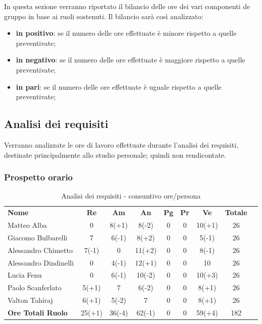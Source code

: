 
In questa sezione verranno riportato il bilancio delle ore dei vari componenti de gruppo in base ai ruoli sostenuti. Il bilancio sarà così analizzato:
\begin{itemize}
	\item {\bfseries in positivo}: se il numero delle ore effettuate è minore rispetto a quelle preventivate;
	\item {\bfseries in negativo}: se il numero delle ore effettuate è maggiore rispetto a quelle preventivate;
	\item {\bfseries in pari}: se il numero delle ore effettuate è uguale rispetto a quelle preventivate; \\
\end{itemize}
\newpage
\subsection {Analisi dei requisiti}
Verranno analizzate le ore di lavoro effettuate durante l'analisi dei requisiti, destinate principalmente allo studio personale; quindi non rendicontate.
\subsubsection{Prospetto orario}
	\begin{table} [h!]
	\begin{center}
		\begin{tabular} { m{6 cm} c c c c c c c c }
			\rowcolor{lightgray}
			\textbf{Nome} & \textbf{Re} & \textbf{Am} & \textbf{An} & \textbf{Pg} &\textbf{Pr} & \textbf{Ve} & \textbf{Totale} \\ 
			Matteo Alba & 0 & 8(+1) &8(-2) & 0 & 0 & 10(+1) & 26  \\ 
			Giacomo Bulbarelli & 7 & 6(-1) & 8(+2) & 0 & 0 & 5(-1) & 26 \\ 
			Alessandro Chimetto & 7(-1) & 0 & 11(+2) & 0 & 0 & 8(-1) & 26 \\
			Alessandro Dindinelli & 0 & 4(-1) & 12(+1) & 0 & 0 & 10 & 26 \\
			Lucia Fenu & 0 & 6(-1) & 10(-2) & 0 & 0 & 10(+3) & 26 \\
			Paolo Scanferlato & 5(+1) & 7 & 6(-2) & 0 & 0 & 8(+1) & 26 \\
			Valton Tahiraj & 6(+1) & 5(-2) &7 & 0 & 0 & 8(+1) & 26 \\
			\textbf{Ore Totali Ruolo} & 25(+1) & 36(-4) & 62(-1) & 0 & 0 & 59(+4) & 182\\
		
		\end{tabular}
		\caption{Analisi dei requisiti - consuntivo ore/persona}
	\end{center}
\end{table}


